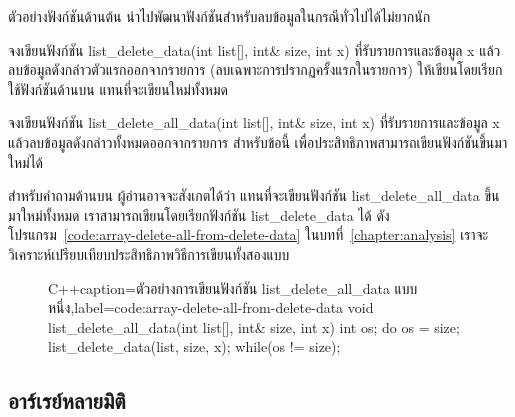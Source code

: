 ตัวอย่าง{\wbr}ฟังก์ชัน{\wbr}ด้าน{\wbr}ต้น นำ{\wbr}ไป{\wbr}พัฒนา{\wbr}ฟังก์ชัน{\wbr}สำหรับ{\wbr}ลบ{\wbr}ข้อมูล{\wbr}ใน{\wbr}กรณี{\wbr}ทั่วไป{\wbr}ได้{\wbr}ไม่{\wbr}ยาก{\wbr}นัก{\wbr}

\begin{quiz}{}
จง{\wbr}เขียน{\wbr}ฟังก์ชัน {\ct list\_delete\_data(int list[], int\& size, int x)}
ที่{\wbr}รับ{\wbr}รายการ{\wbr}และ{\wbr}ข้อมูล {\ct x} แล้ว{\wbr}ลบ{\wbr}ข้อมูล{\wbr}ดังกล่าว{\wbr}ตัว{\wbr}แรก{\wbr}ออก{\wbr}จาก{\wbr}รายการ{\wbr}
(ลบ{\wbr}เฉพาะ{\wbr}การ{\wbr}ปรากฏ{\wbr}ครั้ง{\wbr}แรก{\wbr}ใน{\wbr}รายการ)  ให้{\wbr}เขียน{\wbr}โดย{\wbr}เรียก{\wbr}ใช้{\wbr}ฟังก์ชัน{\wbr}ด้าน{\wbr}บน แทน{\wbr}ที่{\wbr}จะ{\wbr}เขียน{\wbr}ใหม่{\wbr}ทั้งหมด{\wbr}
\end{quiz}

\begin{quiz}{}
จง{\wbr}เขียน{\wbr}ฟังก์ชัน {\ct list\_delete\_all\_data(int list[], int\& size, int
  x)} ที่{\wbr}รับ{\wbr}รายการ{\wbr}และ{\wbr}ข้อมูล {\ct x} แล้ว{\wbr}ลบ{\wbr}ข้อมูล{\wbr}ดังกล่าว{\wbr}ทั้งหมด{\wbr}ออก{\wbr}จาก{\wbr}รายการ{\wbr}
สำหรับ{\wbr}ข้อ{\wbr}นี้ เพื่อ{\wbr}ประสิทธิภาพ{\wbr}สามารถ{\wbr}เขียน{\wbr}ฟังก์ชัน{\wbr}ขึ้น{\wbr}มา{\wbr}ใหม่{\wbr}ได้{\wbr}
\end{quiz}

สำหรับ{\wbr}คำถาม{\wbr}ด้าน{\wbr}บน ผู้อ่าน{\wbr}อาจ{\wbr}จะ{\wbr}สังเกต{\wbr}ได้{\wbr}ว่า แทน{\wbr}ที่{\wbr}จะ{\wbr}เขียน{\wbr}ฟังก์ชัน {\ct
  list\_delete\_all\_data} ขึ้น{\wbr}มา{\wbr}ใหม่{\wbr}ทั้งหมด เรา{\wbr}สามารถ{\wbr}เขียน{\wbr}โดย{\wbr}เรียก{\wbr}ฟังก์ชัน {\ct
  list\_delete\_data} ได้{\wbr}
ดัง{\wbr}โปรแกรม~\ref{code:array-delete-all-from-delete-data}
ใน{\wbr}บท{\wbr}ที่~\ref{chapter:analysis}
เรา{\wbr}จะ{\wbr}วิเคราะห์{\wbr}เปรียบเทียบ{\wbr}ประสิทธิภาพ{\wbr}วิธีการ{\wbr}เขียน{\wbr}ทั้ง{\wbr}สอง{\wbr}แบบ{\wbr}

\begin{figure}
\latintext
\begin{codelist}{C++}{caption={\thaitext ตัวอย่าง{\wbr}การ{\wbr}เขียน{\wbr}ฟังก์ชัน {\ct list\_delete\_all\_data} แบบ{\wbr}หนึ่ง\latintext},label=code:array-delete-all-from-delete-data}
void list_delete_all_data(int list[], int& size, int x)
{
  int os;
  do {
    os = size;
    list_delete_data(list, size, x);
  } while(os != size);
}
\end{codelist}
\thaitext
\end{figure}

\subsection{อาร์เรย์หลาย{\wbr}มิติ}


